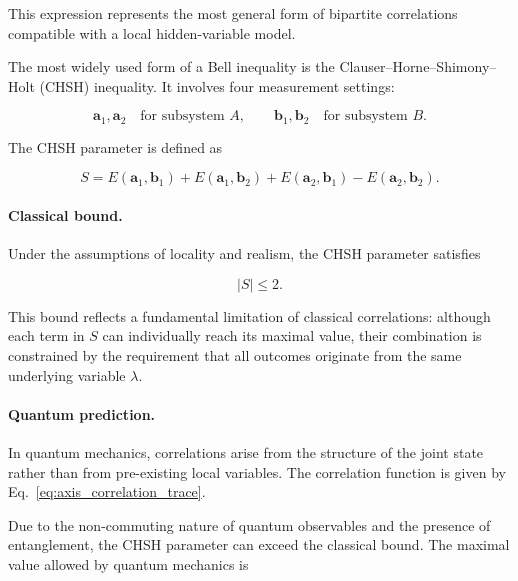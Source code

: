 This expression represents the most general form of bipartite correlations compatible with a local hidden-variable model.

\medskip

The most widely used form of a Bell inequality is the Clauser--Horne--Shimony--Holt (CHSH) inequality. It involves four measurement settings:

\[
\mathbf{a}_1,\mathbf{a}_2
\quad
\text{for subsystem } A,
\qquad
\mathbf{b}_1,\mathbf{b}_2
\quad
\text{for subsystem } B.
\]

The CHSH parameter is defined as

\begin{equation}
S
=
E(\mathbf{a}_1,\mathbf{b}_1)
+
E(\mathbf{a}_1,\mathbf{b}_2)
+
E(\mathbf{a}_2,\mathbf{b}_1)
-
E(\mathbf{a}_2,\mathbf{b}_2).
\label{eq:chsh_parameter}
\end{equation}

\medskip

\paragraph{Classical bound.}

Under the assumptions of locality and realism, the CHSH parameter satisfies

\begin{equation}
|S| \le 2.
\label{eq:chsh_classical_bound}
\end{equation}

This bound reflects a fundamental limitation of classical correlations: although each term in \( S \) can individually reach its maximal value, their combination is constrained by the requirement that all outcomes originate from the same underlying variable \( \lambda \).

\medskip

\paragraph{Quantum prediction.}

In quantum mechanics, correlations arise from the structure of the joint state rather than from pre-existing local variables. The correlation function is given by Eq.~\eqref{eq:axis_correlation_trace}.

Due to the non-commuting nature of quantum observables and the presence of entanglement, the CHSH parameter can exceed the classical bound. The maximal value allowed by quantum mechanics is

